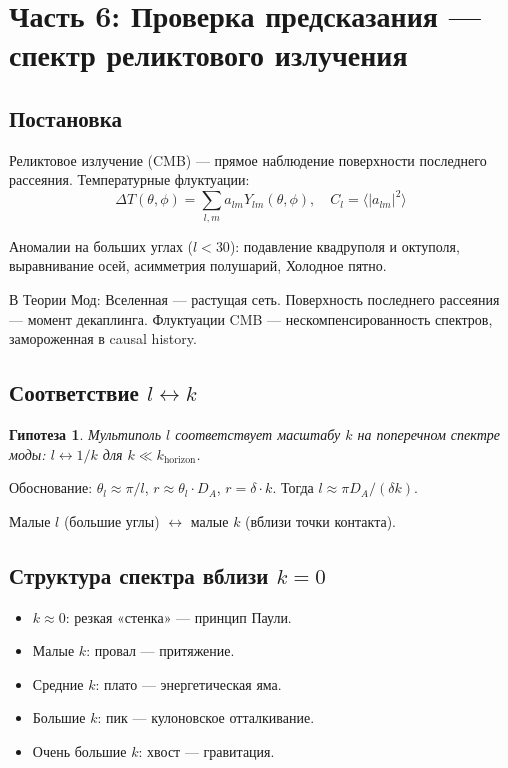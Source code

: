 \documentclass[11pt,a4paper]{article}
\newtheorem{hypothesis}{Гипотеза}[section]
\theoremstyle{definition}
\begin{document}
\newpage
\section{Часть 6: Проверка предсказания --- спектр реликтового излучения}

\subsection{Постановка}

Реликтовое излучение (CMB) --- прямое наблюдение поверхности последнего рассеяния. Температурные флуктуации:
\begin{equation}
    \Delta T(\theta, \phi) = \sum_{l,m} a_{lm} Y_{lm}(\theta, \phi), \quad C_l = \langle |a_{lm}|^2 \rangle
\end{equation}

Аномалии на больших углах ($l < 30$): подавление квадруполя и октуполя, выравнивание осей, асимметрия полушарий, Холодное пятно.

В Теории Мод: Вселенная --- растущая сеть. Поверхность последнего рассеяния --- момент декаплинга. Флуктуации CMB --- нескомпенсированность спектров, замороженная в causal history.

\subsection{Соответствие $l \leftrightarrow k$}

\begin{hypothesis}
Мультиполь $l$ соответствует масштабу $k$ на поперечном спектре моды: $l \leftrightarrow 1/k$ для $k \ll k_{\text{horizon}}$.
\end{hypothesis}

Обоснование: $\theta_l \approx \pi/l$, $r \approx \theta_l \cdot D_A$, $r = \delta \cdot k$. Тогда $l \approx \pi D_A / (\delta k)$.

Малые $l$ (большие углы) $\leftrightarrow$ малые $k$ (вблизи точки контакта).

\subsection{Структура спектра вблизи $k = 0$}

\begin{itemize}
    \item $k \approx 0$: резкая «стенка» --- принцип Паули.
    \item Малые $k$: провал --- притяжение.
    \item Средние $k$: плато --- энергетическая яма.
    \item Большие $k$: пик --- кулоновское отталкивание.
    \item Очень большие $k$: хвост --- гравитация.
\end{itemize}
\end{document}
